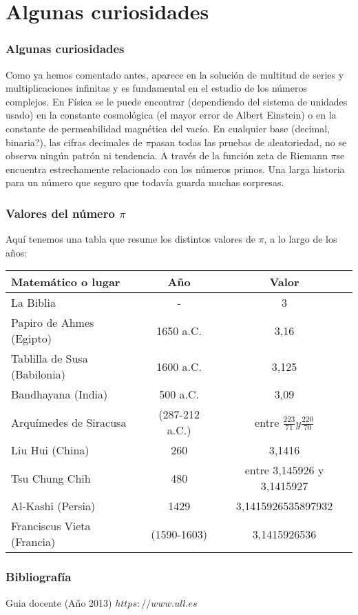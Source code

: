 \documentclass{beamer}
\newcommand{\PI}{{$\pi$}}
\begin{document}
\section{Algunas curiosidades}
\begin{frame}
\frametitle{Algunas curiosidades}

Como ya hemos comentado antes, aparece en la solución de multitud de series y multiplicaciones infinitas y es fundamental en el estudio de los números complejos. En Física se le puede encontrar (dependiendo del sistema de unidades usado) en la constante cosmológica (el mayor error de Albert Einstein) o en la constante de permeabilidad magnética del vacío.
En cualquier base (decimal, binaria?), las cifras decimales de \PI pasan todas las pruebas de aleatoriedad, no se observa ningún patrón ni tendencia. A través de la función zeta de Riemann \PI se encuentra estrechamente relacionado con los números primos.
Una larga historia para un número que seguro que todavía guarda muchas sorpresas.\cite{link1}
\end{frame}

\begin{frame}
\frametitle{Valores del número \PI}
Aquí tenemos una tabla que resume los distintos valores de \PI, a lo largo de los años:

\begin{tabular}{lcc}
Matemático o lugar & Año & Valor\\
\hline
La Biblia & - & 3\\
Papiro de Ahmes (Egipto) & 1650 a.C. & 3,16 \\
Tablilla de Susa (Babilonia) & 1600 a.C. & 3,125 \\
Bandhayana (India) & 500 a.C. & 3,09\\
Arquímedes de Siracusa & (287-212 a.C.) & entre $\frac{223}{71} y \frac{220}{70}$\\
Liu Hui (China) & 260 & 3,1416\\
Tsu Chung Chih & 480 & entre 3,145926 y 3,1415927\\
Al-Kashi (Persia) & 1429 & 3,1415926535897932\\
Franciscus Vieta (Francia) & (1590-1603) & 3,1415926536
\end{tabular}

\end{frame}




\begin{frame}
\frametitle{Bibliografía}
\begin{thebibliography}
\beamertemplatebookbibitems
{}
Guia docente (Año 2013)
{\small $https://www.ull.es$}

\end{thebibliography}
\end{frame}
\end{document}
